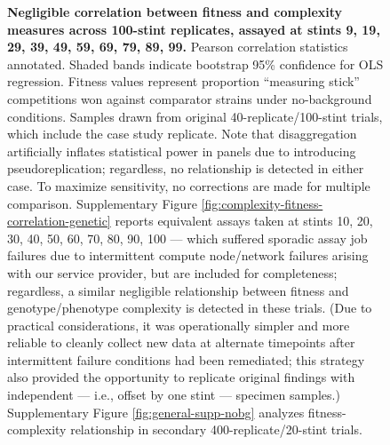 \begin{figure}
\vspace{-1ex}

\caption{%
\textbf{Negligible correlation between fitness and complexity measures across 100-stint replicates, assayed at stints 9, 19, 29, 39, 49, 59, 69, 79, 89, 99.}
\footnotesize
Pearson correlation statistics annotated.
Shaded bands indicate bootstrap 95\% confidence for OLS regression.
Fitness values represent proportion ``measuring stick'' competitions won against comparator strains under no-background conditions.
Samples drawn from original 40-replicate/100-stint trials, which include the case study replicate.
Note that disaggregation artificially inflates statistical power in panels  due to introducing pseudoreplication; regardless, no relationship is detected in either case.
To maximize sensitivity, no corrections are made for multiple comparison.
Supplementary Figure \ref{fig:complexity-fitness-correlation-genetic} reports equivalent assays taken at stints 10, 20, 30, 40, 50, 60, 70, 80, 90, 100 --- which suffered sporadic assay job failures due to intermittent compute node/network failures arising with our service provider, but are included for completeness; regardless, a similar negligible relationship between fitness and genotype/phenotype complexity is detected in these trials.
(Due to practical considerations, it was operationally simpler and more reliable to cleanly collect new data at alternate timepoints after intermittent failure conditions had been remediated; this strategy also provided the opportunity to replicate original findings with independent --- i.e., offset by one stint --- specimen samples.)
Supplementary Figure \ref{fig:general-supp-nobg} analyzes fitness-complexity relationship in secondary 400-replicate/20-stint trials.
}
\label{fig:complexity-fitness-correlation-genetic-9s}

\end{figure}
